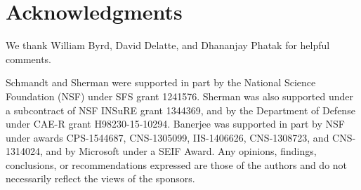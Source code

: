 \section{Acknowledgments}


We thank William Byrd, David Delatte, and Dhananjay Phatak 
for helpful comments.

Schmandt and Sherman were supported in part by the 
National Science Foundation (NSF) under SFS grant 1241576. 
Sherman was also supported under a subcontract of NSF INSuRE grant 1344369, 
and by the Department of Defense under CAE-R grant H98230-15-10294.
Banerjee was supported in part by NSF under awards 
CPS-1544687, CNS-1305099, IIS-1406626, CNS-1308723, and CNS-1314024, 
and by Microsoft under a SEIF Award.
Any opinions, findings, conclusions, or recommendations expressed 
are those of the authors and do not necessarily reflect the views
of the sponsors.
